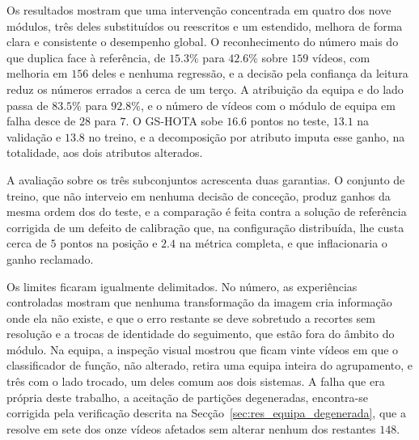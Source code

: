 Os resultados mostram que uma intervenção concentrada em quatro dos nove módulos, três deles
substituídos ou reescritos e um estendido, melhora de forma clara e consistente o desempenho
global. O reconhecimento do número mais do que duplica face à referência, de $15.3\%$ para
$42.6\%$ sobre $159$ vídeos, com melhoria em $156$ deles e nenhuma regressão, e a decisão pela confiança da leitura
reduz os números errados a cerca de um terço. A
atribuição da equipa e do lado passa de $83.5\%$ para $92.8\%$, e o número de vídeos
com o módulo de equipa em falha desce de $28$ para $7$. O GS-HOTA sobe
$16.6$ pontos no teste, $13.1$ na validação e $13.8$ no treino, e a
decomposição por atributo imputa esse ganho, na totalidade, aos dois atributos alterados.

A avaliação sobre os três subconjuntos acrescenta duas garantias. O conjunto de treino, que não
interveio em nenhuma decisão de conceção, produz ganhos da mesma ordem dos do teste, e a
comparação é feita contra a solução de referência corrigida de um defeito de calibração que, na
configuração distribuída, lhe custa cerca de $5$ pontos na posição e $2.4$
na métrica completa, e que inflacionaria o ganho reclamado.

Os limites ficaram igualmente delimitados. No número, as experiências controladas mostram que nenhuma
transformação da imagem cria informação onde ela não existe, e que o erro restante se deve sobretudo
a recortes sem resolução e a trocas de identidade do seguimento, que estão fora do âmbito do módulo. Na equipa, a inspeção
visual mostrou que ficam vinte vídeos em que o classificador de função, não
alterado, retira uma equipa inteira do agrupamento, e três com o lado trocado, um deles comum aos
dois sistemas. A falha que era própria deste trabalho, a aceitação de partições degeneradas,
encontra-se corrigida pela verificação descrita na Secção~\ref{sec:res_equipa_degenerada}, que a
resolve em sete dos onze vídeos afetados sem alterar nenhum dos restantes $148$.
